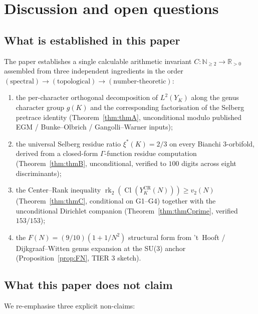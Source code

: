 \documentclass[11pt,a4paper,reqno]{amsart}
\theoremstyle{definition}
\DeclareMathOperator{\Cl}{Cl}
\DeclareMathOperator{\rk}{rk}
\newcommand{\RR}{\mathbb{R}}
\newcommand{\NN}{\mathbb{N}}
\newcommand{\YK}{Y_K}
\newcommand{\gK}{g(K)}
\newcommand{\xis}{\xi^{*}}
\newcommand{\vtwo}{v_2}
\newcommand{\YKCR}{Y_K^{\mathrm{CR}}}
\newcommand{\Cinv}{C}
\begin{document}
\section{Discussion and open questions}\label{sec:open}

\subsection{What is established in this paper}\label{ss:whatisnew}

The paper establishes a single calculable arithmetic invariant
$\Cinv:\NN_{\ge 2}\to\RR_{>0}$ assembled from three independent ingredients
in the order $(\text{spectral})\rightarrow(\text{topological})
\rightarrow(\text{number-theoretic})$:

\begin{enumerate}[label=(\alph*),leftmargin=2em]
  \item the per-character orthogonal decomposition of $L^2(\YK)$ along the
        genus character group $\gK$ and the corresponding factorisation of
        the Selberg pretrace identity (Theorem~\ref{thm:thmA},
        unconditional modulo published EGM / Bunke--Olbrich /
        Gangolli--Warner inputs);
  \item the universal Selberg residue ratio $\xis(K)=2/3$ on every Bianchi
        3-orbifold, derived from a closed-form $\Gamma$-function
        residue computation (Theorem~\ref{thm:thmB}, unconditional, verified
        to $100$ digits across eight discriminants);
  \item the Center--Rank inequality $\rk_2(\Cl(\YKCR(N)))\ge\vtwo(N)$
        (Theorem~\ref{thm:thmC}, conditional on G1--G4) together with the
        unconditional Dirichlet companion (Theorem~\ref{thm:thmCprime},
        verified $153/153$);
  \item the $F(N)=(9/10)(1+1/N^2)$ structural form from 't~Hooft /
        Dijkgraaf--Witten genus expansion at the SU(3) anchor
        (Proposition~\ref{prop:FN}, TIER 3 sketch).
\end{enumerate}

\subsection{What this paper does not claim}\label{ss:notclaimed}

We re-emphasise three explicit non-claims:
\end{document}
